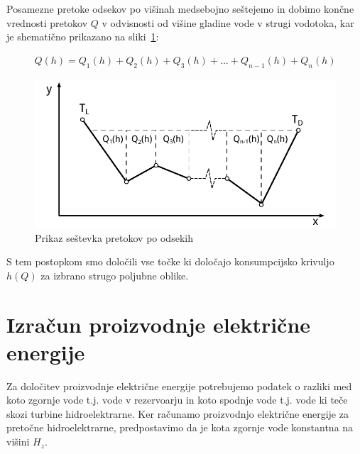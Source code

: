 Posamezne pretoke odsekov po višinah medsebojno seštejemo in dobimo končne vrednosti pretokov $Q$ v odvisnosti od višine gladine vode v strugi vodotoka, kar je shematično prikazano na sliki~\ref{fig:customChannel_sestevek}:

\begin{ceqn}
	\begin{align}
	Q(h) = Q_1(h) + Q_2(h) + Q_3(h) + ... + Q_{n-1}(h) + Q_n(h)
	\end{align}
\end{ceqn}


\begin{figure}[ht!]
	\begin{centering}
		\includegraphics{slike/customChannel/sestevekPretokov.pdf}
		\caption{Prikaz seštevka pretokov po odsekih}\label{fig:customChannel_sestevek}
	\end{centering}
\end{figure}



S tem postopkom smo določili vse točke ki določajo konsumpcijsko krivuljo $h(Q)$ za izbrano strugo poljubne oblike.


\newpage

\section{Izračun proizvodnje električne energije}
Za določitev proizvodnje električne energije potrebujemo podatek o razliki med koto zgornje vode t.j. vode v rezervoarju in koto spodnje vode t.j. vode ki teče skozi turbine hidroelektrarne. Ker računamo proizvodnjo električne energije za pretočne hidroelektrarne, predpostavimo da je kota zgornje vode konstantna na višini $H_z$.

